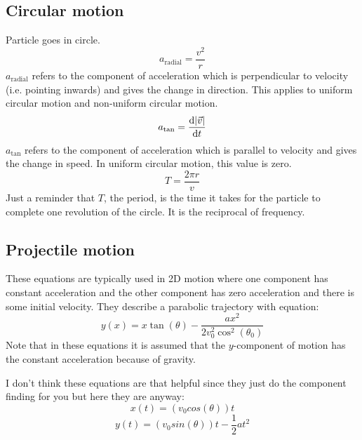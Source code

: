 \documentclass{article}
\numberwithin{equation}{section}
\begin{document}
        \subsection*{Circular motion}
            Particle goes in circle.
            \begin{equation}
                a_{\mathrm{radial}} = \frac{v^2}{r}
            \end{equation}
            $a_{\mathrm{radial}}$ refers to the component of acceleration which is perpendicular to velocity (i.e. pointing inwards) and gives the change in direction. This applies to uniform circular motion and non-uniform circular motion.
            \begin{equation}
                a_{\mathrm{tan}} = \dv{|\vec{v}|}{t}
            \end{equation}
            $a_{\mathrm{tan}}$ refers to the component of acceleration which is parallel to velocity and gives the change in speed. In uniform circular motion, this value is zero.
            \begin{equation}
                T = \frac{2\pi r}{v}
            \end{equation}
            Just a reminder that $T$, the period, is the time it takes for the particle to complete one revolution of the circle. It is the reciprocal of frequency.

        \subsection*{Projectile motion}
            These equations are typically used in 2D motion where one component has constant acceleration and the other component has zero acceleration and there is some initial velocity. They describe a parabolic trajectory with equation:
            \begin{equation}
                y(x) = x\tan(\theta) - \frac{ax^2}{2v_0^2\cos^2(\theta_0)}
            \end{equation}
            Note that in these equations it is assumed that the $y$-component of motion has the constant acceleration because of gravity.

            I don't think these equations are that helpful since they just do the component finding for you but here they are anyway:
            \begin{equation}
                x(t) = (v_0cos(\theta))t
            \end{equation}
            \begin{equation}
                y(t) = (v_0sin(\theta))t - \frac{1}{2}at^2
            \end{equation}
\end{document}
